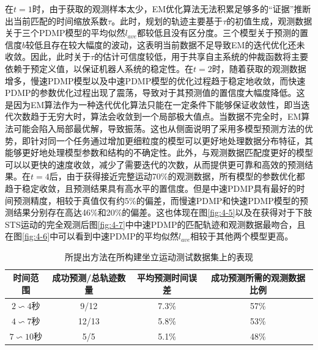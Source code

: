 在$t=1$时，由于获取的观测样本太少，EM优化算法无法积累足够多的``证据''推断出当前匹配的时间缩放系数$\tau$。此时，规划的轨迹主要基于$\tau$的初值生成，观测数据关于三个PDMP模型的平均似然$l_{ave}$都较低且没有区分度。三个模型关于预测的置信度$b$较低且存在较大幅度的波动，这表明当前数据不足导致EM的迭代优化还未收敛。因此，此时关于$\tau$的估计可信度较低，用于共享自主系统的仲裁函数将主要依赖于预定义值，以保证机器人系统的稳定性。在$t=2$时，随着获取的观测数据增多，慢速PDMP模型以及中速PDMP模型的优化过程趋于稳定地收敛，而快速PDMP的参数优化过程出现了震荡，导致对于其预测值的置信度大幅度降低。这是因为EM算法作为一种迭代优化算法只能在一定条件下能够保证收敛性，即当迭代次数趋于无穷大时，算法会收敛到一个局部极大值点。当数据不完全时，EM算法可能会陷入局部最优解，导致振荡。这也从侧面说明了采用多模型预测方法的优势，即针对同一个任务通过增加更细粒度的模型可以更好地处理数据分布特征，其能够更好地处理模型参数和结构的不确定性。此外，与观测数据匹配度更好的模型可以以更快的速度收敛，减少了需要迭代的次数，从而提供更可靠和高效的预测结果。在$t=4$后，由于获得接近完整运动70\%的观测数据，所有模型的参数优化都趋于稳定收敛，且预测结果具有高水平的置信度。但是中速PDMP具有最好的时间预测精度，相较于真值仅有约5\%的偏差，而慢速PDMP和快速PDMP模型的预测结果分别存在高达46\%和20\%的偏差。这也体现在图\ref{fig:4-5}以及在获得对于下肢STS运动的完全观测后图\ref{fig:4-7}中中速PDMP的匹配轨迹和观测数据最吻合，且在图\ref{fig:4-6}中可以看到中速PDMP的平均似然$l_{ave}$相较于其他两个模型更高。
\begin{table}[htb]
    \centering
    \caption{所提出方法在所构建坐立运动测试数据集上的表现}
    \setlength{\tabcolsep}{5pt}
    \begin{tabular}{c c c c}
    \hline\hline
     时间范围 & 成功预测/总轨迹数量 & 平均预测时间误差 & 成功预测所需的观测数据比例\\  
    \hline
    $2\backsim 4$秒& 9/12 & 7.3\%& 57\%\\ 
    $4\backsim 7$秒& 12/13 & 5.8\%& 53\%\\ 
    $7\backsim 10$秒& 5/5 & 5.1\%& 48\%\\ 
    \hline\hline
    \end{tabular}
    \label{tab:4-1}
\end{table}    

